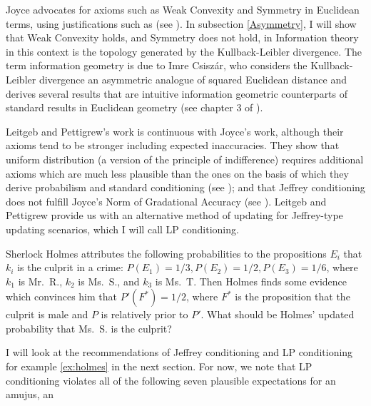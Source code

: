 \documentclass[11pt]{article}
\begin{document}
Joyce advocates for axioms such as Weak Convexity and Symmetry in
Euclidean terms, using justifications such as  (see ). In
subsection \ref{Asymmetry}, I will show that Weak Convexity holds, and
Symmetry does not hold, in  Information
theory in this context is the topology generated by the
Kullback-Leibler divergence. The term information geometry is due to
Imre Csisz{\'a}r, who considers the Kullback-Leibler divergence an
asymmetric analogue of squared Euclidean distance and derives several
results that are intuitive information geometric counterparts of
standard results in Euclidean geometry (see chapter 3 of
).

Leitgeb and Pettigrew's work is continuous with Joyce's work, although
their axioms tend to be stronger including expected inaccuracies. They
show that uniform distribution (a version of the principle of
indifference) requires additional axioms which are much less plausible
than the ones on the basis of which they derive probabilism and
standard conditioning (see ); and
that Jeffrey conditioning does not fulfill Joyce's Norm of Gradational
Accuracy (see ). Leitgeb and Pettigrew provide
us with an alternative method of updating for Jeffrey-type updating
scenarios, which I will call LP conditioning.

\begin{quotex}
  \label{ex:holmes} Sherlock Holmes
  attributes the following probabilities to the propositions $E_{i}$
  that $k_{i}$ is the culprit in a crime:
  $P(E_{1})=1/3,P(E_{2})=1/2,P(E_{3})=1/6$, where $k_{1}$ is Mr.\ R.,
  $k_{2}$ is Ms.\ S., and $k_{3}$ is Ms.\ T. Then Holmes finds some
  evidence which convinces him that $P'(F^{*})=1/2$, where $F^{*}$ is
  the proposition that the culprit is male and $P$ is relatively prior
  to $P'$. What should be Holmes' updated probability that Ms.\ S. is
  the culprit?
\end{quotex}

I will look at the recommendations of Jeffrey conditioning and LP
conditioning for example \ref{ex:holmes} in the next section. For now,
we note that LP conditioning violates all of the following seven
plausible expectations for an amujus, an 
\end{document}
